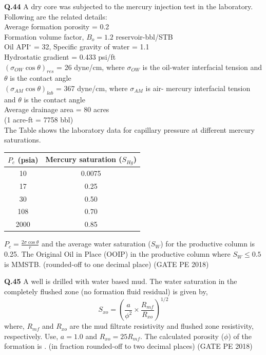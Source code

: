 \documentclass[15pt,a4paper]{article}
\begin{document}
\noindent\textbf{Q.44} A dry core was subjected to the mercury injection test in the laboratory. Following are the related details: \\ 
Average formation porosity = 0.2 \\ 
Formation volume factor, $B_o = 1.2$ reservoir-bbl/STB \\ 
Oil API$^\circ$ = 32, Specific gravity of water = 1.1 \\ 
Hydrostatic gradient = 0.433 psi/ft \\ 
$(\sigma_{OW} \cos \theta)_{res}$ = 26 dyne/cm, where $\sigma_{OW}$ is the oil-water interfacial tension and $\theta$ is the contact angle \\ 
$(\sigma_{AM} \cos \theta)_{lab}$ = 367 dyne/cm, where $\sigma_{AM}$ is air- mercury interfacial tension and $\theta$ is the contact angle \\ 
Average drainage area = 80 acres \\ 
(1 acre-ft = 7758 bbl) \\ 

The Table shows the laboratory data for capillary pressure at different mercury saturations.

\vspace{0.3cm}
\begin{tabular}{|c|c|}
\hline
$P_c$ (psia) & Mercury saturation ($S_{Hg}$) \\
\hline
10 & 0.0075 \\
17 & 0.25 \\
30 & 0.50 \\
108 & 0.70 \\
2000 & 0.85 \\
\hline
\end{tabular}

\vspace{0.3cm}
$P_c = \frac{2\sigma \cos \theta}{r}$ and the average water saturation ($S_W$) for the productive column is 0.25. The Original Oil in Place (OOIP) in the productive column where $S_W \leq 0.5$ is \underline{\hspace{2cm}} MMSTB. (rounded-off to one decimal place) \hfill (GATE PE 2018)

\vspace{1cm}

\noindent\textbf{Q.45} A well is drilled with water based mud. The water saturation in the completely flushed zone (no formation fluid residual) is given by, 
\[ S_{xo} = \left( \frac{a}{\phi^2} \times \frac{R_{mf}}{R_{xo}} \right)^{1/2} \]
where, $R_{mf}$ and $R_{xo}$ are the mud filtrate resistivity and flushed zone resistivity, respectively. Use, $a = 1.0$ and $R_{xo} = 25 R_{mf}$. 
The calculated porosity ($\phi$) of the formation is \underline{\hspace{2cm}}. (in fraction rounded-off to two decimal places) \hfill (GATE PE 2018)
\end{document}
